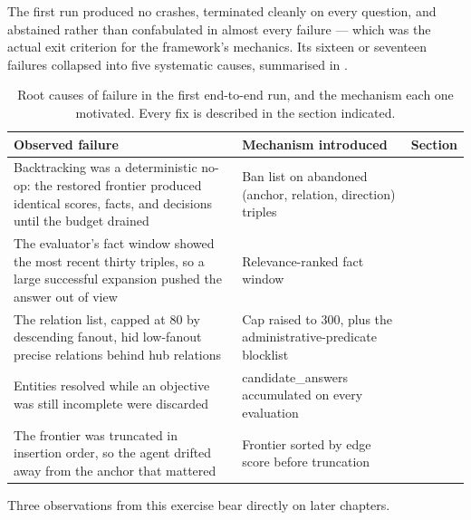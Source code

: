 The first run produced no crashes, terminated cleanly on every question, and
abstained rather than confabulated in almost every failure --- which was the
actual exit criterion for the framework's mechanics. Its sixteen or seventeen
failures collapsed into five systematic causes, summarised in
.

\begin{table}[!tb]
  \begin{center}
    \caption[Root causes of failure in the first end-to-end run]{Root causes of
    failure in the first end-to-end run, and the mechanism each one motivated.
    Every fix is described in the section indicated.}
    \label{tab:rootcauses}
    \footnotesize
    \begin{tabular}{|L{52mm}|L{52mm}|l|}
      \hline
      \textbf{Observed failure} & \textbf{Mechanism introduced} &
      \textbf{Section} \\
      \hline
      Backtracking was a deterministic no-op: the restored frontier produced
      identical scores, facts, and decisions until the budget drained &
      Ban list on abandoned \textsf{(anchor, relation, direction)} triples &
       \\
      \hline
      The evaluator's fact window showed the most recent thirty triples, so a
      large successful expansion pushed the answer out of view &
      Relevance-ranked fact window &  \\
      \hline
      The relation list, capped at 80 by descending fanout, hid low-fanout
      precise relations behind hub relations &
      Cap raised to 300, plus the administrative-predicate blocklist &
       \\
      \hline
      Entities resolved while an objective was still incomplete were discarded &
      \textsf{candidate\_answers} accumulated on every evaluation &
       \\
      \hline
      The frontier was truncated in insertion order, so the agent drifted away
      from the anchor that mattered & Frontier sorted by edge score before
      truncation &  \\
      \hline
    \end{tabular}
  \end{center}
\end{table}

Three observations from this exercise bear directly on later chapters.

